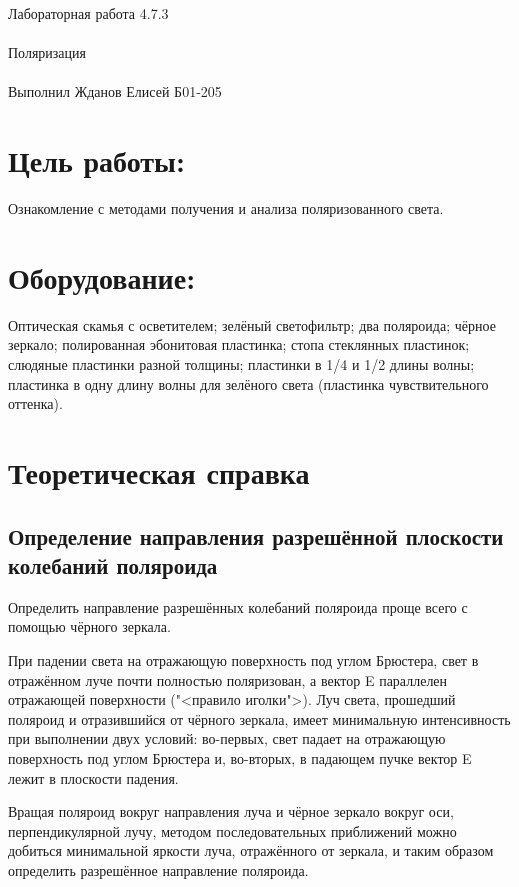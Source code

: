 \documentclass{astroedu-lab}
\begin{document}
\pagestyle{plain}

\begin{problem}{\huge Лабораторная работа 4.7.3\\\\Поляризация\\\\Выполнил Жданов Елисей Б01-205}

\section{Цель работы:}

Ознакомление с методами получения и анализа поляризованного света.

\section{Оборудование:}

Оптическая скамья с осветителем; зелёный светофильтр; два поляроида; чёрное зеркало; полированная эбонитовая пластинка; стопа стеклянных пластинок; слюдяные пластинки разной толщины; пластинки в 1/4 и 1/2 длины волны; пластинка в одну длину волны для зелёного света (пластинка чувствительного оттенка).

\section{Теоретическая справка}

\subsection{Определение направления разрешённой плоскости колебаний поляроида}
	
	Определить направление разрешённых колебаний поляроида проще всего с помощью чёрного зеркала.
	
При падении света на отражающую поверхность под углом Брюстера, свет в отражённом луче почти полностью поляризован, а вектор E
параллелен отражающей поверхности ("<правило иголки">). Луч света,
прошедший поляроид и отразившийся от чёрного зеркала, имеет минимальную интенсивность при выполнении двух условий: во-первых, свет
падает на отражающую поверхность под углом Брюстера и, во-вторых,
в падающем пучке вектор E лежит в плоскости падения.

Вращая поляроид вокруг направления луча и чёрное зеркало вокруг
оси, перпендикулярной лучу, методом последовательных приближений
можно добиться минимальной яркости луча, отражённого от зеркала,
и таким образом определить разрешённое направление поляроида.


\end{problem}
\end{document}
